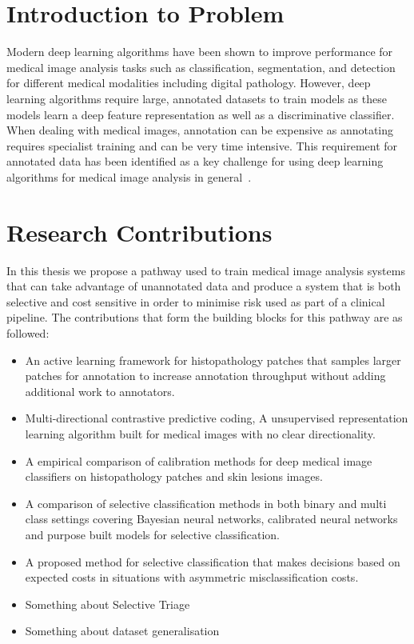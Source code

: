 \section{Introduction to Problem}
\label{sec:intoduction_to_problem}
Modern deep learning algorithms have been shown to improve performance for medical image analysis tasks such as classification, segmentation, and detection for different medical modalities including digital pathology. However, deep learning algorithms require large, annotated datasets to train models as these models learn a deep feature representation as well as a discriminative classifier. When dealing with medical images, annotation can be expensive as annotating requires specialist training and can be very time intensive. This requirement for annotated data has been identified as a key challenge for using deep learning algorithms for medical image analysis in general~\citep{geert2017survey}. 


\section{Research Contributions}
\label{sec:research_contributions}

In this thesis we propose a pathway used to train medical image analysis systems that can take advantage of unannotated data and produce a system that is both selective and cost sensitive in order to minimise risk used as part of a clinical pipeline. The contributions that form the building blocks for this pathway are as followed:

\begin{itemize}
	\item An active learning framework for histopathology patches that samples larger patches for annotation to increase annotation throughput without adding additional work to annotators.
	
	\item Multi-directional contrastive predictive coding, A unsupervised representation learning algorithm built for medical images with no clear directionality.

	\item A empirical comparison of calibration methods for deep medical image classifiers on histopathology patches and skin lesions images.
	
	\item A comparison of selective classification methods in both binary and multi class settings covering Bayesian neural networks, calibrated neural networks and purpose built models for selective classification.
	
	\item A proposed method for selective classification that makes decisions based on expected costs in situations with asymmetric misclassification costs.
	
	\item Something about Selective Triage
	
	\item Something about dataset generalisation
\end{itemize}



